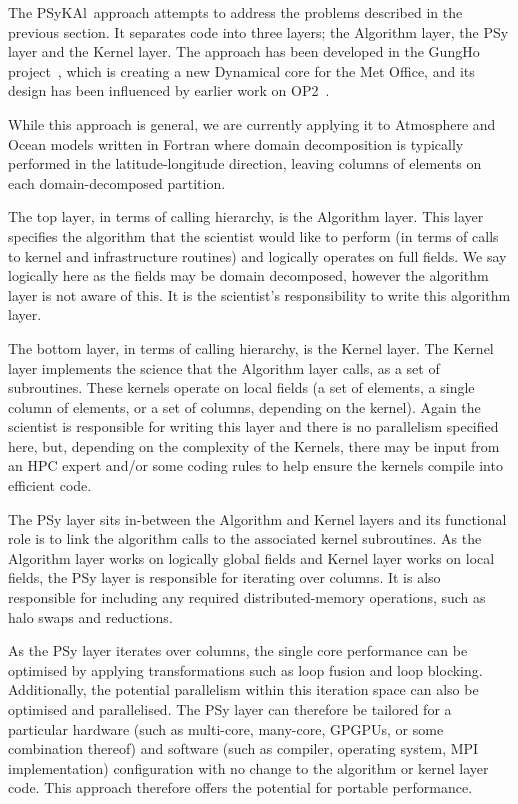 \documentclass{IOS-Book-Article}
\newcommand{\psykal}{{PS}y{KA}l\ }
\begin{document}
The \psykal approach attempts to address the problems described in the
previous section. It separates code into three layers; the Algorithm
layer, the PSy layer and the Kernel layer. The approach has been
developed in the GungHo project~\cite{GungHo}, which is creating a new
Dynamical core for the Met Office, and its design has been influenced
by earlier work on OP2~\cite{OP2,PYOP2}.

While this approach is general, we are currently applying it to
Atmosphere and Ocean models written in Fortran where domain
decomposition is typically performed in the latitude-longitude
direction, leaving columns of elements on each domain-decomposed
partition.

The top layer, in terms of calling hierarchy, is the Algorithm
layer. This layer specifies the algorithm that the scientist would like
to perform (in terms of calls to kernel and infrastructure routines)
and logically operates on full fields. We say logically here as the
fields may be domain decomposed, however the algorithm layer is not
aware of this. It is the scientist's responsibility to write this
algorithm layer.

The bottom layer, in terms of calling hierarchy, is the Kernel
layer. The Kernel layer implements the science that the Algorithm
layer calls, as a set of subroutines. These kernels operate on local
fields (a set of elements, a single column of elements, or a set of
columns, depending on the kernel). Again the scientist is responsible
for writing this layer and there is no parallelism specified here,
but, depending on the complexity of the Kernels, there may be input
from an HPC expert and/or some coding rules to help ensure the kernels
compile into efficient code.

The PSy layer sits in-between the Algorithm and Kernel layers and its
functional role is to link the algorithm calls to the associated
kernel subroutines. As the Algorithm layer works on logically global
fields and Kernel layer works on local fields, the PSy layer is
responsible for iterating over columns. It is also responsible for
including any required distributed-memory operations, such as halo
swaps and reductions.

As the PSy layer iterates over columns, the single core performance
can be optimised by applying transformations such as loop fusion and
loop blocking. Additionally, the potential parallelism within this
iteration space can also be optimised and parallelised. The PSy layer
can therefore be tailored for a particular hardware (such as
multi-core, many-core, GPGPUs, or some combination thereof) and
software (such as compiler, operating system, MPI implementation)
configuration with no change to the algorithm or kernel layer
code. This approach therefore offers the potential for portable
performance.
\end{document}
